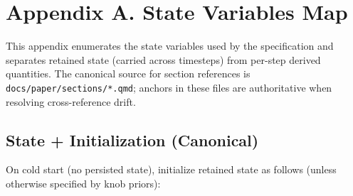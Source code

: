 \documentclass[
  letterpaper,
  DIV=11,
  numbers=noendperiod]{scrartcl}
\begin{document}
\section*{Appendix A. State Variables Map}\label{sec-app-state}

This appendix enumerates the state variables used by the specification
and separates retained state (carried across timesteps) from per-step
derived quantities. The canonical source for section references is
\texttt{docs/paper/sections/*.qmd}; anchors in these files are
authoritative when resolving cross-reference drift.

\subsection*{State + Initialization (Canonical)}\label{sec-state-init}

On cold start (no persisted state), initialize retained state as follows
(unless otherwise specified by knob priors):
\end{document}
